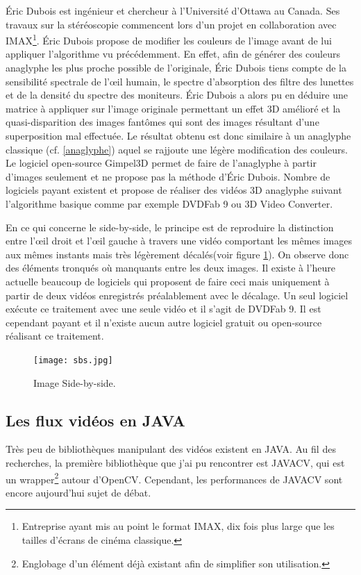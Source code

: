 \documentclass[10pt,a4paper]{article}
\begin{document}
Éric Dubois est ingénieur et chercheur à l'Université d'Ottawa au Canada\cite{duboisbio}. Ses travaux sur la stéréoscopie commencent lors d'un projet en collaboration avec IMAX\footnote{Entreprise ayant mis au point le format IMAX, dix fois plus large que les tailles d'écrans de cinéma classique.}. Éric Dubois propose de modifier les couleurs de l'image avant de lui appliquer l'algorithme vu précédemment.
En effet, afin de générer des couleurs anaglyphe les plus proche possible de l'originale, Éric Dubois tiens compte de la sensibilité spectrale de l'œil humain,
le spectre d'absorption des filtre des lunettes et de la densité du spectre des moniteurs\cite{dubois}.
Éric Dubois a alors pu en déduire une matrice à appliquer sur l'image originale permettant un effet 3D amélioré et la quasi-disparition des images fantômes qui sont des images résultant d'une superposition mal effectuée. Le résultat obtenu est donc similaire à un anaglyphe classique (cf. \ref{anaglyphe}) aquel se rajjoute une légère modification des couleurs.
Le logiciel open-source Gimpel3D permet de faire de l'anaglyphe à partir d'images seulement et ne propose pas la méthode d'Éric Dubois. Nombre de logiciels payant existent et propose de réaliser des vidéos 3D anaglyphe suivant l'algorithme basique comme par exemple DVDFab 9 ou  3D Video Converter.\newline

En ce qui concerne le side-by-side, le principe est de reproduire la distinction entre l'œil droit et l'œil gauche à travers une vidéo comportant les mêmes images aux mêmes instants mais très légèrement décalés(voir figure \ref{sbs}). On observe donc des éléments tronqués où manquants entre les deux images.
Il existe à l'heure actuelle beaucoup de logiciels qui proposent de faire ceci mais uniquement à partir de deux vidéos enregistrés préalablement avec le décalage.
Un seul logiciel exécute ce traitement avec une seule vidéo et il s'agit de DVDFab 9. Il est cependant payant et il n'existe aucun autre logiciel gratuit ou open-source réalisant ce traitement.

\begin{figure}[!h]
\center
\texttt{[image: sbs.jpg]}
\caption{Image Side-by-side.}
\label{sbs}
\end{figure}

\subsection{Les flux vidéos en JAVA}

Très peu de bibliothèques manipulant des vidéos existent en JAVA. Au fil des recherches, la première bibliothèque que j'ai pu rencontrer est JAVACV\cite{javacv}, qui est un wrapper\footnote{Englobage d'un élément déjà existant
afin de simplifier son utilisation.} autour d'OpenCV. Cependant, les performances de JAVACV sont encore aujourd'hui sujet de débat.\\
\end{document}
